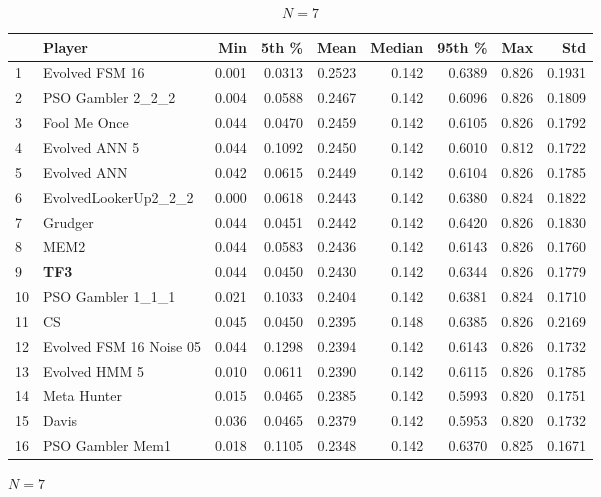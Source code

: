 \documentclass[10pt,letterpaper]{article}
\begin{document}
\begin{table}[!hbtp]
    \begin{subfigure}[t]{\columnwidth}
        \centering
            \begin{tabular}{llrrrrrrr}
            \toprule
            {} &                   Player &    Min &   5th \% &    Mean &  Median &  95th \% &    Max &     Std \\
            \midrule
            1  &           Evolved FSM 16 &  0.001 &  0.0313 &  0.2523 &   0.142 &  0.6389 &  0.826 &  0.1931 \\
            2  &        PSO Gambler 2\_2\_2 &  0.004 &  0.0588 &  0.2467 &   0.142 &  0.6096 &  0.826 &  0.1809 \\
            3  &             Fool Me Once &  0.044 &  0.0470 &  0.2459 &   0.142 &  0.6105 &  0.826 &  0.1792 \\
            4  &            Evolved ANN 5 &  0.044 &  0.1092 &  0.2450 &   0.142 &  0.6010 &  0.812 &  0.1722 \\
            5  &              Evolved ANN &  0.042 &  0.0615 &  0.2449 &   0.142 &  0.6104 &  0.826 &  0.1785 \\
            6  &     EvolvedLookerUp2\_2\_2 &  0.000 &  0.0618 &  0.2443 &   0.142 &  0.6380 &  0.824 &  0.1822 \\
            7  &                  Grudger &  0.044 &  0.0451 &  0.2442 &   0.142 &  0.6420 &  0.826 &  0.1830 \\
            8  &                     MEM2 &  0.044 &  0.0583 &  0.2436 &   0.142 &  0.6143 &  0.826 &  0.1760 \\
            9  &                      \textbf{TF3} &  0.044 &  0.0450 &  0.2430 &   0.142 &  0.6344 &  0.826 &  0.1779 \\
            10 &        PSO Gambler 1\_1\_1 &  0.021 &  0.1033 &  0.2404 &   0.142 &  0.6381 &  0.824 &  0.1710 \\
            11 &                       CS &  0.045 &  0.0450 &  0.2395 &   0.148 &  0.6385 &  0.826 &  0.2169 \\
            12 &  Evolved FSM 16 Noise 05 &  0.044 &  0.1298 &  0.2394 &   0.142 &  0.6143 &  0.826 &  0.1732 \\
            13 &            Evolved HMM 5 &  0.010 &  0.0611 &  0.2390 &   0.142 &  0.6115 &  0.826 &  0.1785 \\
            14 &              Meta Hunter &  0.015 &  0.0465 &  0.2385 &   0.142 &  0.5993 &  0.820 &  0.1751 \\
            15 &                    Davis &  0.036 &  0.0465 &  0.2379 &   0.142 &  0.5953 &  0.820 &  0.1732 \\
            16 &         PSO Gambler Mem1 &  0.018 &  0.1105 &  0.2348 &   0.142 &  0.6370 &  0.825 &  0.1671 \\
            \bottomrule
            \end{tabular}
        \caption{\(N=7\)}
    \end{subfigure}


\end{table}
\end{document}

